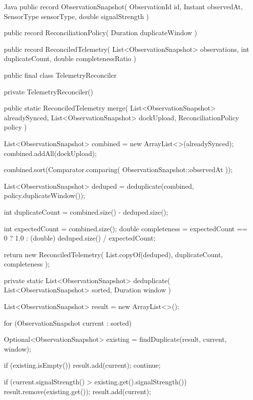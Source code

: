 \begin{ridercode}{Java}
public record ObservationSnapshot(
    ObservationId id,
    Instant observedAt,
    SensorType sensorType,
    double signalStrength
)
{
}

public record ReconciliationPolicy(
    Duration duplicateWindow
)
{
}

public record ReconciledTelemetry(
    List<ObservationSnapshot> observations,
    int duplicateCount,
    double completenessRatio
)
{
}

public final class TelemetryReconciler
{
    private TelemetryReconciler()
    {
    }

    public static ReconciledTelemetry merge(
        List<ObservationSnapshot> alreadySynced,
        List<ObservationSnapshot> dockUpload,
        ReconciliationPolicy policy
    )
    {
        List<ObservationSnapshot> combined =
            new ArrayList<>(alreadySynced);
        combined.addAll(dockUpload);

        combined.sort(Comparator.comparing(
            ObservationSnapshot::observedAt
        ));

        List<ObservationSnapshot> deduped =
            deduplicate(combined, policy.duplicateWindow());

        int duplicateCount =
            combined.size() - deduped.size();

        int expectedCount = combined.size();
        double completeness = expectedCount == 0
            ? 1.0
            : (double) deduped.size() / expectedCount;

        return new ReconciledTelemetry(
            List.copyOf(deduped),
            duplicateCount,
            completeness
        );
    }

    private static List<ObservationSnapshot> deduplicate(
        List<ObservationSnapshot> sorted,
        Duration window
    )
    {
        List<ObservationSnapshot> result =
            new ArrayList<>();

        for (ObservationSnapshot current : sorted)
        {
            Optional<ObservationSnapshot> existing =
                findDuplicate(result, current, window);

            if (existing.isEmpty())
            {
                result.add(current);
                continue;
            }

            if (current.signalStrength()
                > existing.get().signalStrength())
            {
                result.remove(existing.get());
                result.add(current);
            }
        }

}}
\end{ridercode}
